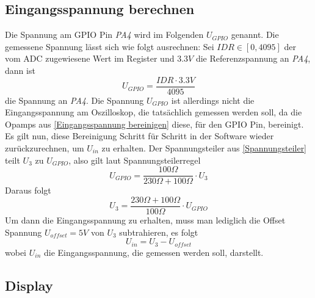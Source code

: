 \subsection{Eingangsspannung berechnen}
Die Spannung am GPIO Pin \textit{PA4} wird im Folgenden $U_{GPIO}$ genannt. \newline
Die gemessene Spannung lässt sich wie folgt ausrechnen: \newline
Sei $IDR \in [0, 4095]$ der vom ADC zugewiesene Wert im Register
und $3.3V$ die Referenzspannung an \textit{PA4},
dann ist
$$
	U_{GPIO} = \frac{IDR \cdot 3.3V}{4095}
$$
die Spannung an \textit{PA4}.
\newline \newline
Die Spannung $U_{GPIO}$ ist allerdings nicht die Eingangsspannung am Oszilloskop, die tatsächlich gemessen werden soll, da die Opamps aus \ref{Eingangsspannung bereinigen} diese, für den GPIO Pin, bereinigt.
Es gilt nun, diese Bereinigung Schritt für Schritt in der Software wieder zurückzurechnen, um $U_{in}$ zu erhalten. \newline
Der Spannungsteiler aus \ref{Spannungsteiler} teilt $U_3$
zu $U_{GPIO}$, also gilt laut Spannungsteilerregel
$$
	U_{GPIO} = \frac{100 \Omega}{230 \Omega + 100 \Omega} \cdot U_3
$$
Daraus folgt
$$
U_3 = \frac{230 \Omega + 100 \Omega}{100 \Omega} \cdot U_{GPIO}
$$
\newline
Um dann die Eingangsspannung zu erhalten, muss man lediglich die Offset Spannung $U_{offset} = 5V$
von $U_3$ subtrahieren, es folgt
$$
	U_{in} = U_3 - U_{offset}
$$
wobei $U_{in}$ die Eingangsspannung, die gemessen werden soll, darstellt.


\subsection{Display}

